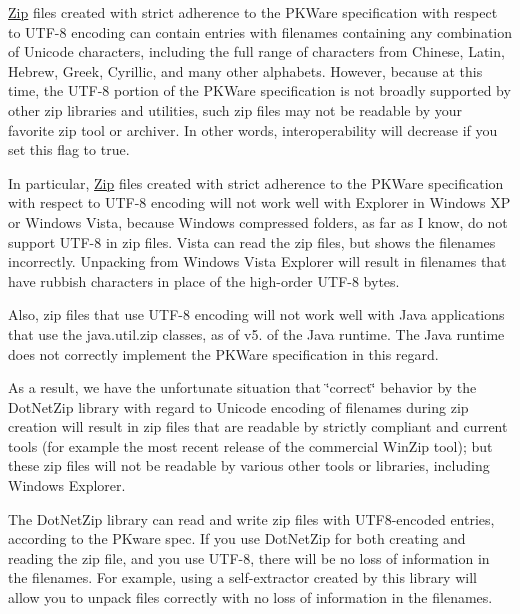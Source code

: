 \mbox{\hyperlink{namespace_super_tiled2_unity_1_1_ionic_1_1_zip}{Zip}} files created with strict adherence to the P\+K\+Ware specification with respect to U\+T\+F-\/8 encoding can contain entries with filenames containing any combination of Unicode characters, including the full range of characters from Chinese, Latin, Hebrew, Greek, Cyrillic, and many other alphabets. However, because at this time, the U\+T\+F-\/8 portion of the P\+K\+Ware specification is not broadly supported by other zip libraries and utilities, such zip files may not be readable by your favorite zip tool or archiver. In other words, interoperability will decrease if you set this flag to true. 

In particular, \mbox{\hyperlink{namespace_super_tiled2_unity_1_1_ionic_1_1_zip}{Zip}} files created with strict adherence to the P\+K\+Ware specification with respect to U\+T\+F-\/8 encoding will not work well with Explorer in Windows XP or Windows Vista, because Windows compressed folders, as far as I know, do not support U\+T\+F-\/8 in zip files. Vista can read the zip files, but shows the filenames incorrectly. Unpacking from Windows Vista Explorer will result in filenames that have rubbish characters in place of the high-\/order U\+T\+F-\/8 bytes. 

Also, zip files that use U\+T\+F-\/8 encoding will not work well with Java applications that use the java.\+util.\+zip classes, as of v5. of the Java runtime. The Java runtime does not correctly implement the P\+K\+Ware specification in this regard. 

As a result, we have the unfortunate situation that \char`\"{}correct\char`\"{} behavior by the Dot\+Net\+Zip library with regard to Unicode encoding of filenames during zip creation will result in zip files that are readable by strictly compliant and current tools (for example the most recent release of the commercial Win\+Zip tool); but these zip files will not be readable by various other tools or libraries, including Windows Explorer. 

The Dot\+Net\+Zip library can read and write zip files with U\+T\+F8-\/encoded entries, according to the P\+Kware spec. If you use Dot\+Net\+Zip for both creating and reading the zip file, and you use U\+T\+F-\/8, there will be no loss of information in the filenames. For example, using a self-\/extractor created by this library will allow you to unpack files correctly with no loss of information in the filenames. 

